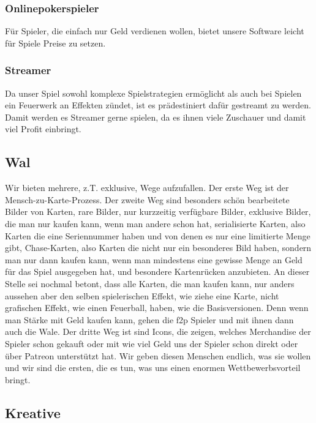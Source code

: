 \documentclass[fontsize=11, a4aper]{scrartcl}
\begin{document}
\subsubsection{Onlinepokerspieler} \label{subsubsec:Wertangebot:Onlinepokerspieler}

Für Spieler, die einfach nur Geld verdienen wollen, bietet unsere Software leicht für Spiele Preise zu setzen.

\subsubsection{Streamer} \label{subsubsec:Wertagebot:Streamer}

Da unser Spiel sowohl komplexe Spielstrategien ermöglicht als auch bei Spielen ein Feuerwerk an Effekten zündet, ist es prädestiniert dafür gestreamt zu werden. Damit werden es Streamer gerne spielen, da es ihnen viele Zuschauer und damit viel Profit einbringt.

\subsection{Wal} \label{subsec:Wertangebot:Wal}

Wir bieten mehrere, z.T. exklusive, Wege aufzufallen. Der erste Weg ist der \glqq Mensch-zu-Karte-Prozess\grqq{}. Der zweite Weg sind besonders schön bearbeitete Bilder von Karten, rare Bilder, nur kurzzeitig verfügbare Bilder, exklusive Bilder, die man nur kaufen kann, wenn man andere schon hat, serialisierte Karten, also Karten die eine Seriennummer haben und von denen es nur eine limitierte Menge gibt, Chase-Karten, also Karten die nicht nur ein besonderes Bild haben, sondern man nur dann kaufen kann, wenn man mindestens eine gewisse Menge an Geld für das Spiel ausgegeben hat, und besondere Kartenrücken anzubieten. An dieser Stelle sei nochmal betont, dass alle Karten, die man kaufen kann, nur anders aussehen aber den selben spielerischen Effekt, wie \glqq ziehe eine Karte\grqq, nicht grafischen Effekt, wie einen Feuerball, haben, wie die Basisversionen. Denn wenn man Stärke mit Geld kaufen kann, gehen die \acl{f2p} Spieler und mit ihnen dann auch die Wale. Der dritte Weg ist sind Icons, die zeigen, welches Merchandise der Spieler schon gekauft oder mit wie viel Geld uns der Spieler schon direkt oder über Patreon unterstützt hat. Wir geben diesen Menschen endlich, was sie wollen und wir sind die ersten, die es tun, was uns einen enormen Wettbewerbsvorteil bringt.

\subsection{Kreative} \label{subsec:Wertangebot:Kreative}
\end{document}
